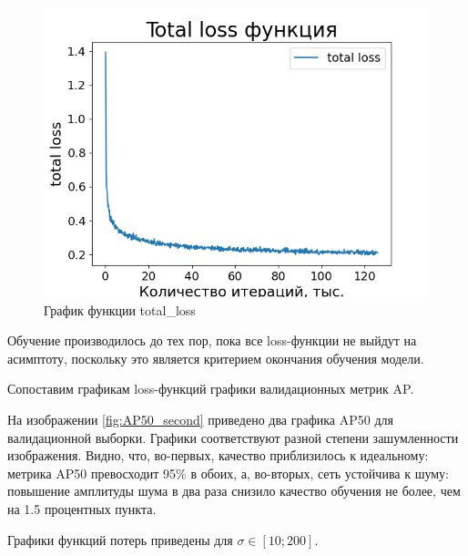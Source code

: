 \begin{figure}[ht!] 
	\center
	\includegraphics [scale=0.8] {my_folder/images/total_loss_second}
	\caption{График функции total\_loss}
	\label{fig:total_loss}
\end{figure}

Обучение производилось до тех пор, пока все loss-функции не выйдут на асимптоту, поскольку это является критерием окончания обучения модели.

Сопоставим графикам loss-функций графики валидационных метрик AP.

На изображении \ref{fig:AP50_second} приведено два графика AP50 для валидационной выборки. Графики соответствуют разной степени зашумленности изображения. Видно, что, во-первых, качество приблизилось к идеальному: метрика AP50 превосходит 95\% в обоих, а, во-вторых, сеть устойчива к шуму: повышение амплитуды шума в два раза снизило качество обучения не более, чем на 1.5 процентных пункта.

Графики функций потерь приведены для $\sigma \in [10; 200]$.

